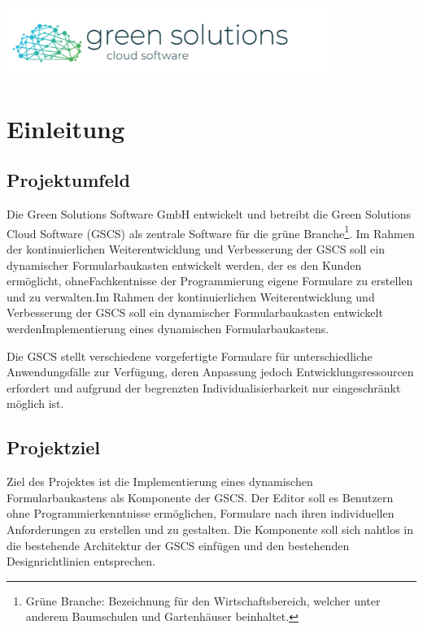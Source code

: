 \documentclass[a4paper,11pt]{article}
\begin{document}
\begin{titlepage}
\begin{center}
\includegraphics[width=0.8\textwidth]{green_solutions_logo}
\end{center}
\end{titlepage}

\tableofcontents
\newpage


\section{Einleitung}
\subsection{Projektumfeld}
Die Green Solutions Software GmbH entwickelt und betreibt die Green Solutions Cloud Software (GSCS) als zentrale Software für die grüne Branche\footnote{Grüne Branche: Bezeichnung für den Wirtschaftsbereich, welcher unter anderem Baumschulen und Gartenhäuser beinhaltet.}. Im Rahmen der kontinuierlichen Weiterentwicklung und Verbesserung der GSCS soll ein dynamischer Formularbaukasten entwickelt werden, der es den Kunden ermöglicht, ohneFachkentnisse der Programmierung eigene Formulare zu erstellen und zu verwalten.Im Rahmen der kontinuierlichen Weiterentwicklung und Verbesserung der GSCS soll ein dynamischer Formularbaukasten entwickelt werdenImplementierung eines dynamischen Formularbaukastens.

\noindent Die GSCS stellt verschiedene vorgefertigte Formulare für unterschiedliche Anwendungsfälle zur Verfügung, deren Anpassung jedoch Entwicklungsressourcen erfordert und aufgrund der begrenzten Individualisierbarkeit nur eingeschränkt möglich ist.

\subsection{Projektziel}
Ziel des Projektes ist die Implementierung eines dynamischen Formularbaukastens als Komponente der GSCS. Der Editor soll es Benutzern ohne Programmierkenntnisse ermöglichen, Formulare nach ihren individuellen Anforderungen zu erstellen und zu gestalten. Die Komponente soll sich nahtlos in die bestehende Architektur der GSCS einfügen und den bestehenden Designrichtlinien entsprechen.
\end{document}
